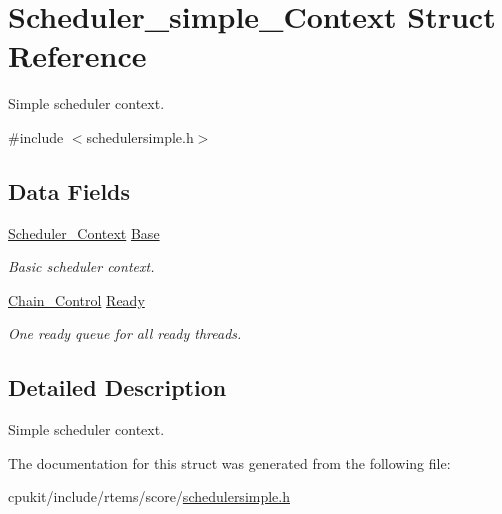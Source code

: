 \hypertarget{structScheduler__simple__Context}{}\section{Scheduler\+\_\+simple\+\_\+\+Context Struct Reference}
\label{structScheduler__simple__Context}


Simple scheduler context.  




{\ttfamily \#include $<$schedulersimple.\+h$>$}

\subsection*{Data Fields}
\begin{DoxyCompactItemize}
\item 
\mbox{\label{structScheduler__simple__Context_a3ab44406190c824605a8be37dedd52f0}} 
\mbox{\hyperlink{structScheduler__Context}{Scheduler\+\_\+\+Context}} \mbox{\hyperlink{structScheduler__simple__Context_a3ab44406190c824605a8be37dedd52f0}{Base}}
\begin{DoxyCompactList}\small\item\em Basic scheduler context. \end{DoxyCompactList}\item 
\mbox{\label{structScheduler__simple__Context_acb2df37eb35c4d394c2559547c5386c7}} 
\mbox{\hyperlink{unionChain__Control}{Chain\+\_\+\+Control}} \mbox{\hyperlink{structScheduler__simple__Context_acb2df37eb35c4d394c2559547c5386c7}{Ready}}
\begin{DoxyCompactList}\small\item\em One ready queue for all ready threads. \end{DoxyCompactList}\end{DoxyCompactItemize}


\subsection{Detailed Description}
Simple scheduler context. 

The documentation for this struct was generated from the following file\+:\begin{DoxyCompactItemize}
\item 
cpukit/include/rtems/score/\mbox{\hyperlink{schedulersimple_8h}{schedulersimple.\+h}}\end{DoxyCompactItemize}
